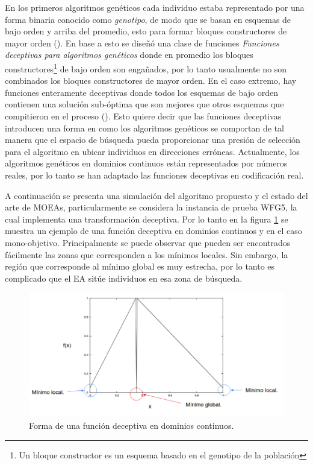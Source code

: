 En los primeros algoritmos genéticos cada individuo estaba representado por una forma binaria conocido como \textit{genotipo}, de modo que se basan en esquemas de bajo orden y arriba del promedio, esto para formar bloques constructores de mayor orden (\cite{goldberg1987genetic}).
%
En base a esto se diseñó una clase de funciones \textit{Funciones deceptivas para algoritmos genéticos} donde en promedio los bloques constructores\footnote{Un bloque constructor es un esquema basado en el genotipo de la población } de bajo orden son engañados, por lo tanto usualmente no son combinados los bloques constructores de mayor orden. En el caso extremo, hay funciones enteramente deceptivas donde todos los esquemas de bajo orden contienen una solución sub-óptima que son mejores que otros esquemas que compitieron en el proceso (\cite{deb1993analyzing}).
%
Esto quiere decir que las funciones deceptivas introducen una forma en como los algoritmos genéticos se comportan de tal manera que el espacio de búsqueda pueda proporcionar una presión de selección para el algoritmo en ubicar individuos en direcciones erróneas.
%
%
Actualmente, los algoritmos genéticos en dominios continuos están representados por números reales, por lo tanto se han adaptado las funciones deceptivas en codificación real.

A continuación se presenta una simulación del algoritmo propuesto y el estado del arte de MOEAs, particularmente se considera la instancia de prueba WFG5, la cual implementa una transformación deceptiva.
%
Por lo tanto en la figura \ref{fig:Forma_Deceptiva} se muestra un ejemplo de una función deceptiva en dominios continuos y en el caso mono-objetivo.
%
Principalmente se puede observar que pueden ser encontrados fácilmente las zonas que corresponden a los mínimos locales.
%
Sin embargo, la región que corresponde al mínimo global es muy estrecha, por lo tanto es complicado que el EA sitúe individuos en esa zona de búsqueda.
%



\begin{figure}[H]
\centering
\scriptsize
\includegraphics[scale=0.3]
{Figures_Chapter3/Forma_Deceptiva.png}
\decoRule
\caption{Forma de una función deceptiva en dominios continuos.}
\label{fig:Forma_Deceptiva}
\end{figure}

